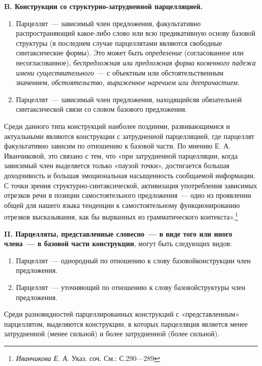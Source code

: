 \documentclass{kursa4}
\begin{document}
{{      {\centering\textbf{B. Конструкции со структурно-затрудненной парцелляцией.}}
      \begin{enumerate}
        \item {Парцеллят~--- зависимый член предложения,
        факультативно распространяющий какое-либо слово или всю предикативную
        основу базовой структуры (в последнем случае парцеллятами являются
        свободные синтаксические формы). Это может быть
        }\textit{определение}
        (согласованное или несогласованное), \textit{беспредложная или предложная форма
        косвенного падежа имени существительного}~--- с
        объектным или обстоятельственным значением,
        \textit{обстоятельство, выраженное наречием или
        деепричастием}.
        \item {Парцеллят~--- зависимый член предложения,
        находящийся}в обязательной
        синтаксической связи со словом базового предложения.
      \end{enumerate}

      Среди данного типа конструкций наиболее поздними,
      развивающимися и актуальными являются конструкции с затрудненной
      парцелляцией, где парцеллят факультативно зависим по отношению к
      базовой части. По мнению Е. А. Иванчиковой, это связано с тем, что «при
      затрудненной парцелляции, когда зависимый член выделяется только «паузой точки»,
      достигается большая доходчивость и большая эмоциональная насыщенность
      сообщаемой информации. С точки зрения структурно-синтаксической,
      активизация употребления зависимых отрезков речи в позиции
      самостоятельного предложения~--- одно из проявлении общей для нашего
      языка тенденции к самостоятельному функционированию отрезков
      высказывания, как бы вырванных из грамматического
      контекста».\footnote{\textit{ Иванчикова Е. А.
      }{Указ. соч. См.: С.290—289}}

      \textbf{II. Парцелляты, представленные словесно~---
      в виде того или иного члена~--- в базовой части
      конструкции}, могут быть следующих видов:
      \begin{enumerate}
        \item {Парцеллят~--- однородный по отношению к слову
        базовой}{конструкции член
        предложения.}
        \item {Парцеллят~--- уточняющий по отношению к слову
        базовой}{структуры член
        предложения.}
      \end{enumerate}

      Среди разновидностей парцеллированных конструкций
      с «представленным» парцеллятом, выделяются конструкции, в которых
      парцелляция является менее затрудненной (менее сильной) и более
      затрудненной (более сильной).

}}
\end{document}
